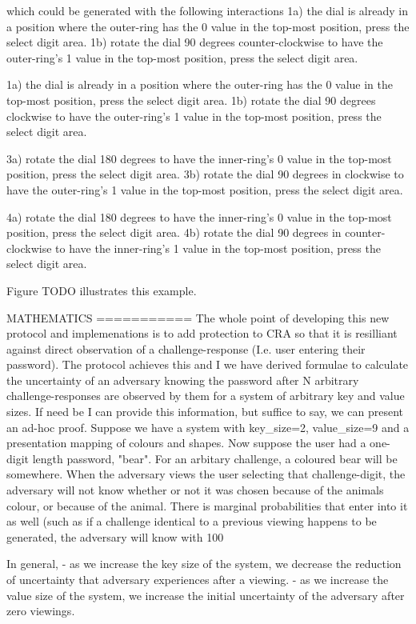 \documentclass[12pt]{document}
\begin{document}
\begin{Introduction}
which could be generated with the following interactions
 1a) the dial is already in a position where the outer-ring has the 0 value in the top-most position, press the select digit area.
 1b) rotate the dial 90 degrees counter-clockwise to have the outer-ring's 1 value in the top-most position, press the select digit area.

 1a) the dial is already in a position where the outer-ring has the 0 value in the top-most position, press the select digit area.
 1b) rotate the dial 90 degrees clockwise to have the outer-ring's 1 value in the top-most position, press the select digit area.

 3a) rotate the dial 180 degrees to have the inner-ring's 0 value in the top-most position, press the select digit area.
 3b) rotate the dial 90 degrees in clockwise to have the outer-ring's 1 value in the top-most position, press the select digit area.

 4a) rotate the dial 180 degrees to have the inner-ring's 0 value in the top-most position, press the select digit area.
 4b) rotate the dial 90 degrees in counter-clockwise to have the inner-ring's 1 value in the top-most position, press the select digit area.

Figure TODO illustrates this example.



MATHEMATICS
===========
The whole point of developing this new protocol and implemenations is to add protection to CRA so that it is resilliant against direct observation of a challenge-response (I.e. user entering their password). The protocol achieves this and I we have derived formulae to calculate the uncertainty of an adversary knowing the password after N arbitrary challenge-responses are observed by them for a system of arbitrary key and value sizes. If need be I can provide this information, but suffice to say, we can present an ad-hoc proof.
Suppose we have a system with key_size=2, value_size=9 and a presentation mapping of colours and shapes.
Now suppose the user had a one-digit length password, "bear".
For an arbitary challenge, a coloured bear will be somewhere. When the adversary views the user selecting that challenge-digit, the adversary will not know whether or not it was chosen because of the animals colour, or because of the animal. There is marginal probabilities that enter into it as well (such as if a challenge identical to a previous viewing  happens to be generated, the adversary will know with 100%

In general, 
- as we increase the key size of the system, we decrease the reduction of uncertainty that adversary experiences after a viewing.
- as we increase the value size of the system, we increase the initial uncertainty of the adversary after zero viewings.


\end{Introduction}
\end{document}
